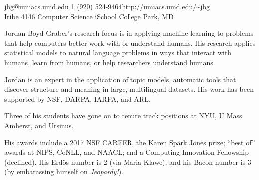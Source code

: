 \documentclass[10pt,a4paper]{article} %
\begin{document}


\noindent\href{mailto:jbg@umiacs.umd.edu}{jbg@umiacs.umd.edu}\bull %
\textsmaller{+}1 (920) 524-9464\bull \href{http://umiacs.umd.edu/~jbg}{\url{http://umiacs.umd.edu/~jbg}}\\ %
Iribe 4146 \bull Computer Science \bull iSchool \bull College Park, MD

\spacedhrule{0.9em}{-0.4em} %



\vspace{-1.3em} %

\begin{multicols}{2}  %

Jordan Boyd-Graber's research focus is in applying machine learning
to problems that help computers better
work with or understand humans.  His research
applies statistical models to natural language problems in ways that
interact with humans, learn from humans, or help researchers
understand humans.

Jordan is an expert in the application of topic models, automatic
tools that discover structure and meaning in large, multilingual
datasets. His work has been supported by NSF, DARPA, IARPA, and ARL.

Three of his students have gone on to tenure track positions at NYU, U
Mass Amherst, and Ursinus.

His awards include a 2017 NSF CAREER, the Karen Sp\"ark Jones prize;
``best of'' awards at NIPS, CoNLL, and NAACL; and a Computing
Innovation Fellowship (declined).  His Erd\"os number is 2 (via Maria Klawe), and his
Bacon number is 3 (by embarassing himself on \textit{Jeopardy!}).

\end{multicols}
\end{document}
